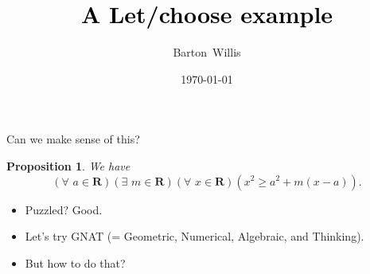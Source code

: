 \documentclass[usenames,dvipsnames,fleqn,leqno,10pt, pdflatex]{beamer}
\title[] %
{\textcolor{black}{\textbf{A Let/choose example}} \\ 
\vspace{0.2in}
}
\date{\today}
\author[] %
{Barton~Willis}
\newcommand{\reals}{\mathbf{R}}
\newtheorem{myprop}{Proposition}
\begin{document}
\frame{\titlepage}

\begin{frame}{Can we make sense of this?}

\begin{myprop}
We have
\begin{equation*}
    \left(\forall \,\, a \in \reals\right)\left(\exists \,\,  m \in \reals\right)\left (\forall \,\, x \in \reals \right)\left(x^2 \geq a^2 + m (x-a) \right).
\end{equation*}
\end{myprop}

\begin{itemize}
    \item Puzzled? Good.
    \item Let's try GNAT (= Geometric, Numerical, Algebraic, and Thinking).
    \item But how to do that?
 \end{itemize}

\vfill

\end{frame}
\end{document}
